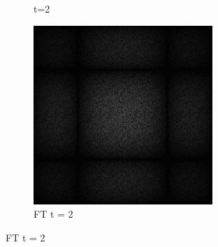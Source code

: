 \begin{figure}[H]
\begin{tcolorbox}[boxrule=4pt,sharp corners=downhill,title=Bedeutung des Retargeting]
\begin{subfigure}[b]{0.2\linewidth}
      \caption{t=2}
      \label{pic:sortier_screen_t2}
    \end{subfigure}
    \begin{subfigure}[b]{0.2\linewidth}
        \includegraphics[width=\linewidth]{content/TemporalerAlg/Bilder/Retargeting/Bedeutung Retargeting/Sorting_Small_Block/Spektrum/Ausschnitt3.png}
        \caption{FT t = 2}
        \label{pic:sortier_t2}
      \end{subfigure}
    \tcblower

\end{tcolorbox}
\end{figure}
